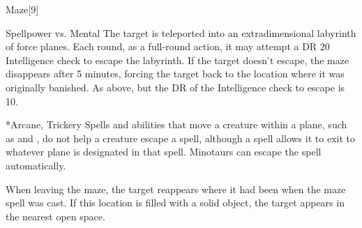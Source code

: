 \begin{spellsection}{Maze}[9]
    \begin{spellheader}
    \end{spellheader}
    \begin{spellcontent}
        \begin{spelltargetinginfo}
        \end{spelltargetinginfo}
        \begin{spelleffects}
            \begin{spellattack}{Spellpower vs. Mental}
                \spellsuccess The target is teleported into an extradimensional labyrinth of force planes. Each round, as a full-round action, it may attempt a DR 20 Intelligence check to escape the labyrinth. If the target doesn't escape, the maze disappears after 5 minutes, forcing the target back to the location where it was originally banished.
                \spellfailure As above, but the DR of the Intelligence check to escape is 10.
            \end{spellattack}
        \end{spelleffects}
    \end{spellcontent}
    \begin{spellfooter}
        *{Arcane, Trickery}
        \spellnotes Spells and abilities that move a creature within a plane, such as  and , do not help a creature escape a  spell, although a  spell allows it to exit to whatever plane is designated in that spell. Minotaurs can escape the spell automatically.

        When leaving the maze, the target reappears where it had been when the maze spell was cast. If this location is filled with a solid object, the target appears in the nearest open space.

        \norepeatspellnotes
        \miscastrandom
    \end{spellfooter}
\end{spellsection}

